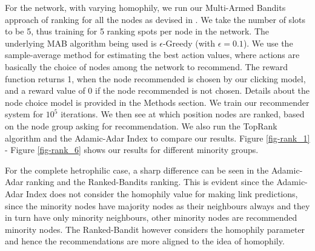 For the network, with varying homophily, we run our Multi-Armed Bandits approach of ranking for all the nodes as devised in \cite{radlinski2008learning}. We take the number of slots to be 5, thus training for 5 ranking spots per node in the network. The underlying MAB algorithm being used is $\epsilon$-Greedy (with $\epsilon=0.1$). We use the sample-average method for estimating the best action values, where actions are basically the choice of nodes among the network to recommend. The reward function returns 1, when the node recommended is chosen by our clicking model, and a reward value of 0 if the node recommended is not chosen. Details about the node choice model is provided in the Methods section. We train our recommender system for $10^5$ iterations. We then see at which position nodes are ranked, based on the node group asking for recommendation. We also run the TopRank algorithm \cite{lattimore2018toprank} and the Adamic-Adar Index to compare our results. Figure \ref{fig-rank_1} - Figure \ref{fig-rank_6} shows our results for different minority groups.

For the complete hetrophilic case, a sharp difference can be seen in the Adamic-Adar ranking and the Ranked-Bandits ranking. This is evident since the Adamic-Adar Index does not consider the homophily value for making link predictions, since the minority nodes have majority nodes as their neighbours always and they in turn have only minority neighbours, other minority nodes are recommended minority nodes. The Ranked-Bandit however considers the homophily parameter and hence the recommendations are more aligned to the idea of homophily.

\bigskip